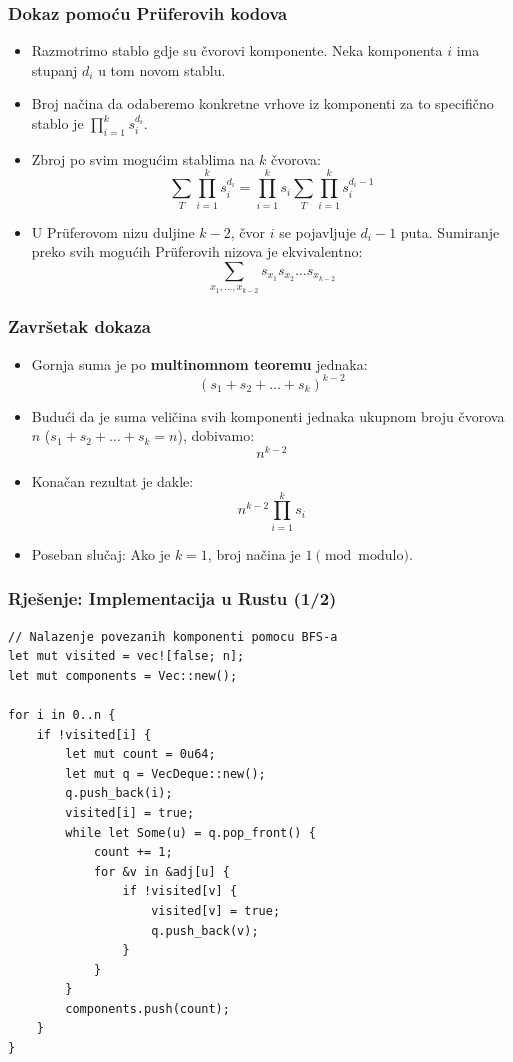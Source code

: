 \documentclass{beamer}
\begin{document}
\begin{frame}
\frametitle{Dokaz pomoću Prüferovih kodova}
\begin{itemize}
    \item Razmotrimo stablo gdje su čvorovi komponente. Neka komponenta $i$ ima stupanj $d_i$ u tom novom stablu.
    \item Broj načina da odaberemo konkretne vrhove iz komponenti za to specifično stablo je $\prod_{i=1}^k s_i^{d_i}$.
    \item Zbroj po svim mogućim stablima na $k$ čvorova:
    \[ \sum_{T} \prod_{i=1}^k s_i^{d_i} = \prod_{i=1}^k s_i \sum_{T} \prod_{i=1}^k s_i^{d_i - 1} \]
    \item U Prüferovom nizu duljine $k-2$, čvor $i$ se pojavljuje $d_i - 1$ puta. Sumiranje preko svih mogućih Prüferovih nizova je ekvivalentno:
    \[ \sum_{x_1, \dots, x_{k-2}} s_{x_1} s_{x_2} \dots s_{x_{k-2}} \]
\end{itemize}
\end{frame}

\begin{frame}
\frametitle{Završetak dokaza}
\begin{itemize}
    \item Gornja suma je po \textbf{multinomnom teoremu} jednaka:
    \[ (s_1 + s_2 + \dots + s_k)^{k-2} \]
    \item Budući da je suma veličina svih komponenti jednaka ukupnom broju čvorova $n$ ($s_1 + s_2 + \dots + s_k = n$), dobivamo:
    \[ n^{k-2} \]
    \item Konačan rezultat je dakle:
    \[ n^{k-2} \prod_{i=1}^k s_i \]
    \item Poseban slučaj: Ako je $k=1$, broj načina je $1 \pmod{\text{modulo}}$.
\end{itemize}
\end{frame}

\begin{frame}[fragile]
\frametitle{Rješenje: Implementacija u Rustu (1/2)}
\begin{lstlisting}[basicstyle=\ttfamily\tiny]
// Nalazenje povezanih komponenti pomocu BFS-a
let mut visited = vec![false; n];
let mut components = Vec::new();

for i in 0..n {
    if !visited[i] {
        let mut count = 0u64;
        let mut q = VecDeque::new();
        q.push_back(i);
        visited[i] = true;
        while let Some(u) = q.pop_front() {
            count += 1;
            for &v in &adj[u] {
                if !visited[v] {
                    visited[v] = true;
                    q.push_back(v);
                }
            }
        }
        components.push(count);
    }
}
\end{lstlisting}
\end{frame}
\end{document}
